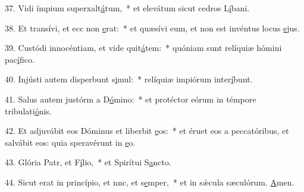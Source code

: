 37. Vidi ímpium superxalt\uline{á}tum,~* et elevátum sicut cedros L\uline{í}bani.\par 
38. Et transívi, et ecc non \uline{e}rat:~* et quæsívi eum, et non est invéntus locus \uline{e}jus.\par 
39. Custódi innocéntiam, et vide quit\uline{á}tem:~* quóniam sunt relíquiæ hómini pac\uline{í}fico.\par 
40. Injústi autem disperbunt s\uline{i}mul:~* relíquiæ impiórum inter\uline{í}bunt.\par 
41. Salus autem justórm a D\uline{ó}mino:~* et protéctor eórum in témpore tribulati\uline{ó}nis.\par 
42. Et adjuvábit eos Dóminus et liberbit \uline{e}os:~* et éruet eos a peccatóribus, et salvábit eos: quia speravérunt in \uline{e}o.\par 
43. Glória Patr, et F\uline{í}lio,~* et Spirítui S\uline{a}ncto.\par 
44. Sicut erat in princípio, et nnc, et s\uline{e}mper,~* et in sǽcula sæculórum. \uline{A}men.\par 

